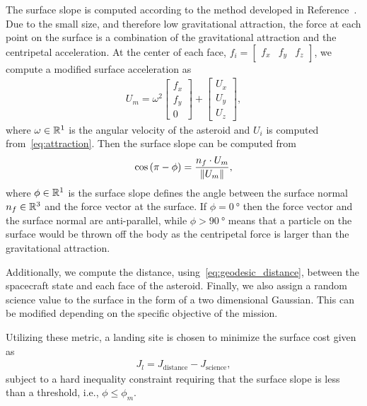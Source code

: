 \documentclass[journal]{new-aiaa}
\begin{document}
The surface slope is computed according to the method developed in Reference~\cite{scheeres1996}.
Due to the small size, and therefore low gravitational attraction, the force at each point on the surface is a combination of the gravitational attraction and the centripetal acceleration.
At the center of each face, \( f_i = \begin{bmatrix} f_x & f_y & f_z \end{bmatrix} \), we compute a modified surface acceleration as
\begin{align}\label{eq:surface_force}
    U_m = \omega^2 \begin{bmatrix} f_x \\ f_y \\ 0 \end{bmatrix} + \begin{bmatrix} U_x \\ U_y \\ U_z \end{bmatrix},
\end{align}
where \( \omega \in \mathbb{R}^1 \) is the angular velocity of the asteroid and \( U_i \) is computed from~\cref{eq:attraction}.
Then the surface slope can be computed from
\begin{align}\label{eq:surface_slope}
    \cos \left(  \pi - \phi  \right) = \frac{n_f \cdot U_m}{\left\| U_m \right\|},
\end{align}
where \( \phi \in \mathbb{R}^1 \) is the surface slope defines the angle between the surface normal \( n_f \in \mathbb{R}^3 \) and the force vector at the surface.
If \( \phi = \SI{0}{\degree} \) then the force vector and the surface normal are anti-parallel, while \( \phi > \SI{90}{\degree} \) means that a particle on the surface would be thrown off the body as the centripetal force is larger than the gravitational attraction.

Additionally, we compute the distance, using~\cref{eq:geodesic_distance}, between the spacecraft state and each face of the asteroid. 
Finally, we also assign a random science value to the surface in the form of a two dimensional Gaussian.
This can be modified depending on the specific objective of the mission. 

Utilizing these metric, a landing site is chosen to minimize the surface cost given as
\begin{align}\label{eq:surface_cost}
    J_l =  J_{\text{distance}} - J_{\text{science}},
\end{align}
subject to a hard inequality constraint requiring that the surface slope is less than a threshold, i.e., \( \phi \leq \phi_m \).
\end{document}
